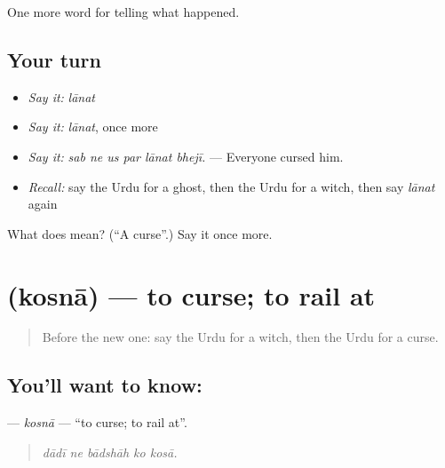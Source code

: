 \begin{grammarlens}[title={What you've built}]
One more word for telling what happened.
\end{grammarlens}

\subsection*{Your turn}
\begin{itemize}
\raggedright
  \item \emph{Say it:} \emph{lānat}
  \item \emph{Say it:} \emph{lānat}, once more
  \item \emph{Say it:} \emph{sab ne us par lānat bhejī.} — Everyone cursed him.
  \item \emph{Recall:} say the Urdu for a ghost, then the Urdu for a witch, then say \emph{lānat} again
\end{itemize}

\begin{tcolorbox}[breakable,colback=teal!4,colframe=teal!35!black,title={Before you move on}]
What does  mean? (\textquotedblleft{}A curse\textquotedblright{}.) Say it once more.
\end{tcolorbox}
\section[\texorpdfstring{\ur{کوسنا} (kosnā)}{کوسنا (kosnā)}]{ (kosnā) — to curse; to rail at}

\label{lesson:UR-C326-kosna}



\begin{quote}
Before the new one: say the Urdu for a witch, then the Urdu for a curse.
\end{quote}

\subsection*{You'll want to know: }
\textbf{} — \emph{kosnā} — \textquotedblleft{}to curse; to rail at\textquotedblright{}.

\begin{quote}
    
\end{quote}

\begin{quote}
\emph{dādī ne bādshāh ko kosā.}
\end{quote}

